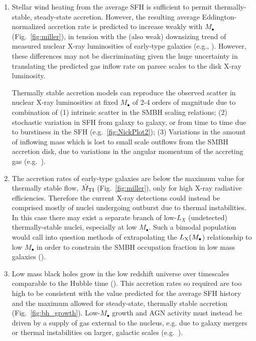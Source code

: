 \documentclass[usenatbib,fleqn]{mn2e}
\newcommand{\Mbh}[1][]{M_{\bullet#1}}
\begin{document}
\begin{enumerate}
\item Stellar wind heating from the average SFH is sufficient to
  permit thermally-stable, steady-state accretion.  However, the
  resulting average Eddington-normalized accretion rate is predicted
  to increase weakly with $M_{\bullet}$ (Fig.~\ref{fig:miller}), in
  tension with the (also weak) downsizing trend of measured nuclear
  X-ray luminosities of early-type galaxies (e.g.,
  \citealt{Miller+15}).  However, these differences may not be
  discriminating given the huge uncertainty in translating the
  predicted gas inflow rate on parsec scales to the disk X-ray
  luminosity.

  Thermally stable accretion models can reproduce the observed scatter
  in nuclear X-ray luminosities at fixed $\Mbh$ of 2-4 orders of
  magnitude due to combination of (1) intrinsic scatter in the SMBH
  scaling relations; (2) stochastic variation in SFH from galaxy to
  galaxy, or from time to time due to burstiness in the SFH
  (e.g.~\ref{fig:NickPlot2}); (3) Variations in the amount of
  inflowing mass which is lost to small scale outflows from the SMBH
  accretion disk, due to variations in the angular momentum of the
  accreting gas (e.g.~\citealt{Li+13}).

\item The accretion rates of early-type galaxies are below the maximum
  value for thermally stable flow, $\dot{M}_{\rm TI}$
  (Fig.~\ref{fig:miller}), only for high X-ray radiative efficiencies.
  Therefore the current X-ray detections could instead be comprised
  mostly of nuclei undergoing outburst due to thermal instabilities.
  In this case there may exist a separate branch of low-$L_X$
  (undetected) thermally-stable nuclei, especially at low
  $M_{\bullet}$.  Such a bimodal population would call into question
  methods of extrapolating the $L_{\rm X}(M_{\bullet}$) relationship
  to low $M_{\bullet}$ in order to constrain the SMBH occupation
  fraction in low mass galaxies (\citealt{Miller+15}).

\item Low mass black holes grow in the low redshift universe over
  timescales comparable to the Hubble time (\citealt{Heckman+04}).  This
  accretion rates so required are too high to be consistent with the
  value predicted for the average SFH history and the maximum allowed
  for steady-state, thermally stable accretion
  (Fig.~\ref{fig:bh_growth}).  Low-$M_{\bullet}$ growth and AGN
  activity must instead be driven by a supply of gas external to the
  nucleus, e.g. due to galaxy mergers or thermal instabilities on
  larger, galactic scales (e.g.~\citealt{Voit+15}).

    

\end{enumerate}
   
\end{document}
